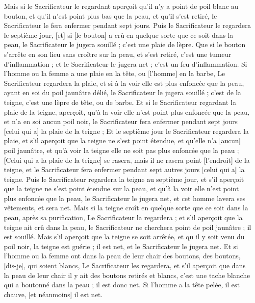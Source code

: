 \begin{multicols}{2}
Mais si le Sacrificateur le regardant aperçoit qu'il n'y a point de poil blanc au bouton, et qu'il n'est point plus bas que la peau, et qu'il s'est retiré, le Sacrificateur le fera enfermer pendant sept jours.
Puis le Sacrificateur le regardera le septième jour, [et] si [le bouton] a crû en quelque sorte que ce soit dans la peau, le Sacrificateur le jugera souillé ; c'est une plaie de lèpre.
Que si le bouton s'arrête en son lieu sans croître sur la peau, et s'est retiré, c'est une tumeur d'inflammation ; et le Sacrificateur le jugera net ; c'est un feu d'inflammation.
Si l'homme ou la femme a une plaie en la tête, ou [l'homme] en la barbe,
Le Sacrificateur regardera la plaie, et si à la voir elle est plus enfoncée que la peau, ayant en soi du poil jaunâtre délié, le Sacrificateur le jugera souillé ; c'est de la teigne, c'est une lèpre de tête, ou de barbe.
Et si le Sacrificateur regardant la plaie de la teigne, aperçoit, qu'à la voir elle n'est point plus enfoncée que la peau, et n'a en soi aucun poil noir, le Sacrificateur fera enfermer pendant sept jours [celui qui a] la plaie de la teigne ;
Et le septième jour le Sacrificateur regardera la plaie, et s'il aperçoit que la teigne ne s'est point étendue, et qu'elle n'a [aucun] poil jaunâtre, et qu'à voir la teigne elle ne soit pas plus enfoncée que la peau ;
[Celui qui a la plaie de la teigne] se rasera, mais il ne rasera point [l'endroit] de la teigne, et le Sacrificateur fera enfermer pendant sept autres jours [celui qui a] la teigne.
Puis le Sacrificateur regardera la teigne au septième jour, et s'il aperçoit que la teigne ne s'est point étendue sur la peau, et qu'à la voir elle n'est point plus enfoncée que la peau, le Sacrificateur le jugera net, et cet homme lavera ses vêtements, et sera net.
Mais si la teigne croît en quelque sorte que ce soit dans la peau, après sa purification,
Le Sacrificateur la regardera ; et s'il aperçoit que la teigne ait crû dans la peau, le Sacrificateur ne cherchera point de poil jaunâtre ; il est souillé.
Mais s'il aperçoit que la teigne se soit arrêtée, et qu il y soit venu du poil noir, la teigne est guérie ; il est net, et le Sacrificateur le jugera net.
Et si l'homme ou la femme ont dans la peau de leur chair des boutons, des boutons, [dis-je], qui soient blancs,
Le Sacrificateur les regardera, et s'il aperçoit que dans la peau de leur chair il y ait des boutons retirés et blancs, c'est une tache blanche qui a boutonné dans la peau ; il est donc net.
Si l'homme a la tête pelée, il est chauve, [et néanmoins] il est net.

\end{multicols}
